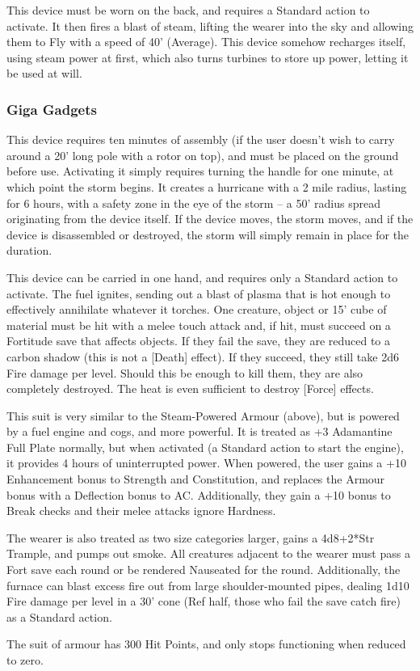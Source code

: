 {This device must be worn on the back, and requires a Standard action to activate. It then fires a blast of steam, lifting the wearer into the sky and allowing them to Fly with a speed of 40' (Average). This device somehow recharges itself, using steam power at first, which also turns turbines to store up power, letting it be used at will.}

\subsubsection{Giga Gadgets}

{This device requires ten minutes of assembly (if the user doesn't wish to carry around a 20' long pole with a rotor on top), and must be placed on the ground before use. Activating it simply requires turning the handle for one minute, at which point the storm begins. It creates a hurricane with a 2 mile radius, lasting for 6 hours, with a safety zone in the eye of the storm -- a 50' radius spread originating from the device itself. If the device moves, the storm moves, and if the device is disassembled or destroyed, the storm will simply remain in place for the duration.}

{This device can be carried in one hand, and requires only a Standard action to activate. The fuel ignites, sending out a blast of plasma that is hot enough to effectively annihilate whatever it torches. One creature, object or 15' cube of material must be hit with a melee touch attack and, if hit, must succeed on a Fortitude save that affects objects. If they fail the save, they are reduced to a carbon shadow (this is not a [Death] effect). If they succeed, they still take 2d6 Fire damage per level. Should this be enough to kill them, they are also completely destroyed. The heat is even sufficient to destroy [Force] effects.}

{This suit is very similar to the Steam-Powered Armour (above), but is powered by a fuel engine and cogs, and more powerful. It is treated as +3 Adamantine Full Plate normally, but when activated (a Standard action to start the engine), it provides 4 hours of uninterrupted power. When powered, the user gains a +10 Enhancement bonus to Strength and Constitution, and replaces the Armour bonus with a Deflection bonus to AC. Additionally, they gain a +10 bonus to Break checks and their melee attacks ignore Hardness.\medskip

\noindent The wearer is also treated as two size categories larger, gains a 4d8+2*Str Trample, and pumps out smoke. All creatures adjacent to the wearer must pass a Fort save each round or be rendered Nauseated for the round. Additionally, the furnace can blast excess fire out from large shoulder-mounted pipes, dealing 1d10 Fire damage per level in a 30' cone (Ref half, those who fail the save catch fire) as a Standard action.\medskip

\noindent The suit of armour has 300 Hit Points, and only stops functioning when reduced to zero.}

